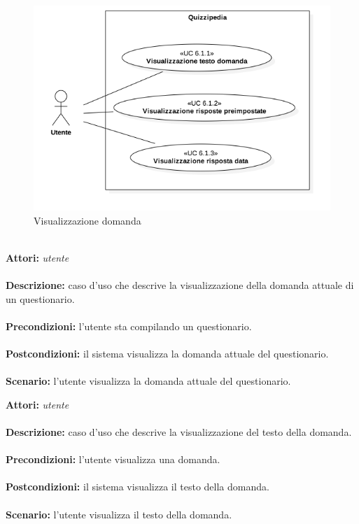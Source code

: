\documentclass[a4paper,11pt]{article}
\begin{document}
\begin{figure}[h!]
\centering
\includegraphics[scale=0.6]{../immagini/UC6_1.png}
\caption{Visualizzazione domanda}
\end{figure}
\ \\
\textbf{Attori:} \textit{utente}
\\ \\
\textbf{Descrizione:} caso d'uso che descrive la visualizzazione della domanda attuale di un questionario.\\
\\
\textbf{Precondizioni:} l'utente sta compilando un questionario.\\
\\
\textbf{Postcondizioni:} il sistema visualizza la domanda attuale del questionario.\\
\\
\textbf{Scenario:} l’utente visualizza la domanda attuale del questionario.\\



\textbf{Attori:} \textit{utente}
\\ \\
\textbf{Descrizione:} caso d'uso che descrive la visualizzazione del testo della domanda.\\
\\
\textbf{Precondizioni:} l'utente visualizza una domanda.\\
\\
\textbf{Postcondizioni:} il sistema visualizza il testo della domanda.\\
\\
\textbf{Scenario:} l’utente visualizza il testo della domanda.\\
\end{document}
